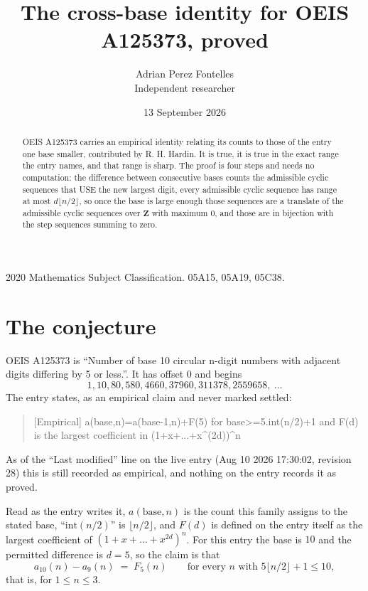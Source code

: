 \documentclass[11pt,a4paper]{article}
\title{The cross-base identity for OEIS A125373, proved}
\author{Adrian Perez Fontelles\\ \small Independent researcher}
\date{13 September 2026}
\theoremstyle{plain}
\theoremstyle{definition}
\begin{document}
\maketitle

\begin{abstract}
OEIS A125373 carries an empirical identity relating its counts to those of the entry one base
smaller, contributed by R. H. Hardin. It is true, it is true in the exact range the entry
names, and that range is sharp. The proof is four steps and needs no computation: the
difference between consecutive bases counts the admissible cyclic sequences that USE the new
largest digit, every admissible cyclic sequence has range at most $d\lfloor n/2\rfloor$, so
once the base is large enough those sequences are a translate of the admissible cyclic
sequences over $\mathbf{Z}$ with maximum $0$, and those are in bijection with the step
sequences summing to zero.
\end{abstract}

\noindent\small 2020 Mathematics Subject Classification. 05A15, 05A19, 05C38.\normalsize

\section{The conjecture}

OEIS A125373 is ``Number of base 10 circular n-digit numbers with adjacent digits differing by 5 or less.''. It has offset $0$ and begins
\[
1, 10, 80, 580, 4660, 37960, 311378, 2559658,\ \dots
\]
The entry states, as an empirical claim and never marked settled:
\begin{quote}
[Empirical] a(base,n)=a(base-1,n)+F(5) for base>=5.int(n/2)+1 and F(d) is the largest coefficient in (1+x+...+x\textasciicircum{}(2d))\textasciicircum{}n
\end{quote}
As of the ``Last modified'' line on the live entry (Aug 10 2026 17:30:02, revision 28)
this is still recorded as empirical, and nothing on the entry records it as proved.

Read as the entry writes it, $a(\mathrm{base},n)$ is the count this family assigns to the
stated base, ``$\mathrm{int}(n/2)$'' is $\lfloor n/2\rfloor$, and $F(d)$ is defined on the
entry itself as the largest coefficient of $(1+x+\dots+x^{2d})^{n}$. For this entry
the base is $10$ and the permitted difference is $d=5$, so the claim is that
\[
a_{10}(n)-a_{9}(n)\;=\;F_{5}(n)
\qquad\text{for every } n \text{ with } 5\lfloor n/2\rfloor+1\le10,
\]
that is, for $1\le n\le3$.
\end{document}
